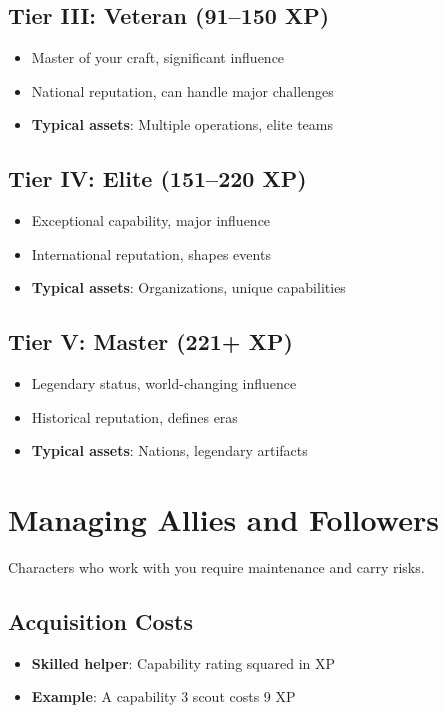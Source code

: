 \begin{multicols}{2}
\subsection*{Tier III: Veteran (91–150 XP)}
\begin{itemize}
\item Master of your craft, significant influence
\item National reputation, can handle major challenges
\item \textbf{Typical assets}: Multiple operations, elite teams
\end{itemize}

\subsection*{Tier IV: Elite (151–220 XP)}
\begin{itemize}
\item Exceptional capability, major influence
\item International reputation, shapes events
\item \textbf{Typical assets}: Organizations, unique capabilities
\end{itemize}

\subsection*{Tier V: Master (221+ XP)}
\begin{itemize}
\item Legendary status, world-changing influence
\item Historical reputation, defines eras
\item \textbf{Typical assets}: Nations, legendary artifacts
\end{itemize}

\section{Managing Allies and Followers}

Characters who work with you require maintenance and carry risks.

\subsection*{Acquisition Costs}
\begin{itemize}
\item \textbf{Skilled helper}: Capability rating squared in XP
\item \textbf{Example}: A capability 3 scout costs 9 XP
\end{itemize}


\end{multicols}
